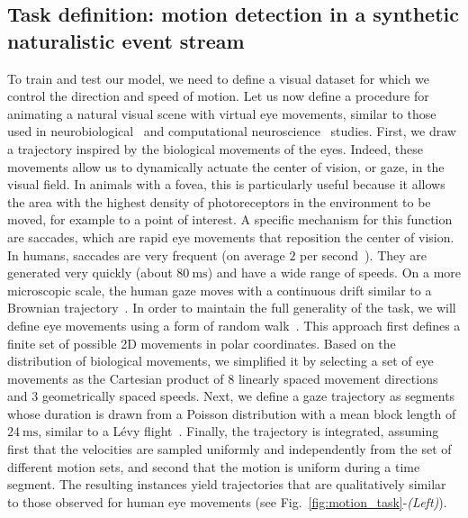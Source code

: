 \documentclass[default]{sn-jnl}%
\theoremstyle{thmstyleone}%
\theoremstyle{thmstyletwo}%
\theoremstyle{thmstylethree}%
\newcommand{\seeFig}[1]{see Fig.~\ref{fig:#1}}%
\newcommand{\ms}{\si{\milli\second}}%
\begin{document}
\subsection{Task definition: motion detection in a synthetic naturalistic event stream}\label{sec:task}
To train and test our model, we need to define a visual dataset for which we control the direction and speed of motion. Let us now define a procedure for animating a natural visual scene with virtual eye movements, similar to those used in neurobiological~\citep{vinje_sparse_2000, baudot_animation_2013} and computational neuroscience~\citep{kremkow_push-pull_2016} studies. First, we draw a trajectory inspired by the biological movements of the eyes. Indeed, these movements allow us to dynamically actuate the center of vision, or gaze, in the visual field. In animals with a fovea, this is particularly useful because it allows the area with the highest density of photoreceptors in the environment to be moved, for example to a point of interest. A specific mechanism for this function are saccades, which are rapid eye movements that reposition the center of vision. In humans, saccades are very frequent (on average $2$ per second~\citep{dandekar_neural_2012}). They are generated very quickly (about $80~\ms$) and have a wide range of speeds. On a more microscopic scale, the human gaze moves with a continuous drift similar to a Brownian trajectory~\citep{poletti_head-eye_2015}. In order to maintain the full generality of the task, we will define eye movements using a form of random walk~\citep{engbert_integrated_2011}. This approach first defines a finite set of possible 2D movements in polar coordinates. Based on the distribution of biological movements, we simplified it by selecting a set of eye movements as the Cartesian product of $8$ linearly spaced movement directions and 3 geometrically spaced speeds. Next, we define a gaze trajectory as segments whose duration is drawn from a Poisson distribution with a mean block length of $24~\ms$, similar to a Lévy flight~\citep[p. 289]{mandelbrot_fractal_1982}. Finally, the trajectory is integrated, assuming first that the velocities are sampled uniformly and independently from the set of different motion sets, and second that the motion is uniform during a time segment. The resulting instances yield trajectories that are qualitatively similar to those observed for human eye movements (\seeFig{motion_task}-\textit{(Left)}).
\end{document}
